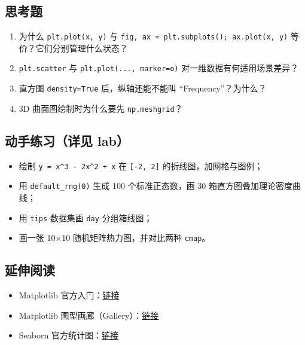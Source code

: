 \subsection{思考题}\label{ux601dux8003ux9898-16}

\begin{enumerate}
\def\labelenumi{\arabic{enumi}.}
\tightlist
\item
  为什么 \texttt{plt.plot(x,\ y)} 与
  \texttt{fig,\ ax\ =\ plt.subplots();\ ax.plot(x,\ y)}
  等价？它们分别管理什么状态？
\item
  \texttt{plt.scatter} 与
  \texttt{plt.plot(...,\ marker=\textquotesingle{}o\textquotesingle{})}
  对一维数据有何适用场景差异？
\item
  直方图 \texttt{density=True} 后，纵轴还能不能叫
  ``Frequency''？为什么？
\item
  3D 曲面图绘制时为什么要先 \texttt{np.meshgrid}？
\end{enumerate}

\subsection{动手练习（详见
lab）}\label{ux52a8ux624bux7ec3ux4e60ux8be6ux89c1-lab-8}

\begin{itemize}
\tightlist
\item
  绘制 \texttt{y\ =\ x\^{}3\ -\ 2x\^{}2\ +\ x} 在 \texttt{{[}-2,\ 2{]}}
  的折线图，加网格与图例；
\item
  用 \texttt{default\_rng(0)} 生成 100 个标准正态数，画 30
  箱直方图叠加理论密度曲线；
\item
  用 \texttt{tips} 数据集画 \texttt{day} 分组箱线图；
\item
  画一张 10×10 随机矩阵热力图，并对比两种 \texttt{cmap}。
\end{itemize}

\subsection{延伸阅读}\label{ux5ef6ux4f38ux9605ux8bfb-21}

\begin{itemize}
\tightlist
\item
  Matplotlib
  官方入门：\href{https://matplotlib.org/stable/tutorials/introductory/quick_start.html}{链接}
\item
  Matplotlib
  图型画廊（Gallery）：\href{https://matplotlib.org/stable/gallery/index.html}{链接}
\item
  Seaborn
  官方统计图：\href{https://seaborn.pydata.org/tutorial.html}{链接}
\end{itemize}

